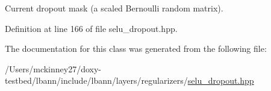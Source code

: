 Current dropout mask (a scaled Bernoulli random matrix). 

Definition at line 166 of file selu\+\_\+dropout.\+hpp.



The documentation for this class was generated from the following file\+:\begin{DoxyCompactItemize}
\item 
/\+Users/mckinney27/doxy-\/testbed/lbann/include/lbann/layers/regularizers/\hyperlink{selu__dropout_8hpp}{selu\+\_\+dropout.\+hpp}\end{DoxyCompactItemize}
